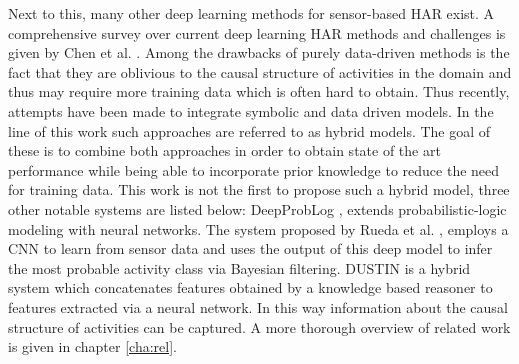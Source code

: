 \documentclass[11pt,titlepage,oneside,openany]{book}
\begin{document}
Next to this, many other deep learning methods for sensor-based HAR exist. A comprehensive survey over current deep learning HAR methods and challenges is given by Chen et al. \cite{chen_deep_2022}. Among the drawbacks of purely data-driven methods is the fact that they are oblivious to the causal structure of activities in the domain and thus may require more training data which is often hard to obtain. Thus recently, attempts have been made to integrate symbolic and data driven models. In the line of this work such approaches are referred to as hybrid models. The goal of these is to combine both approaches in order to obtain state of the art performance while being able to incorporate prior knowledge to reduce the need for training data. This work is not the first to propose such a hybrid model, three other notable systems are listed below: DeepProbLog \cite{manhaeve_deepproblog_2018}, extends probabilistic-logic modeling with neural networks. The system proposed by Rueda et al. \cite{rueda_combining_2019}, employs a CNN to learn from sensor data and uses the output of this deep model to infer the most probable activity class via Bayesian filtering. DUSTIN \cite{arrotta_knowledge_2022} is a hybrid system which concatenates features obtained by a knowledge based reasoner to features extracted via a neural network. In this way information about the causal structure of activities can be captured. A more thorough overview of related work is given in chapter \ref{cha:rel}.
\end{document}
